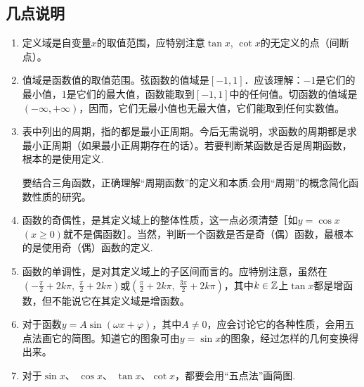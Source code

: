 \begin{figure}[htp]








    \caption{}
\end{figure}



\subsection*{几点说明}
\begin{enumerate}
    \item 定义域是自变量$x$的取值范围，应特别注意$\tan x$, $\cot x$的无定义的点（间断点）。
    \item 值域是函数值的取值范围。弦函数的值域是$[-1,1]$．应该理解：$-1$是它们的最小值，1是它们的最大值，函数能取到$[-1,1]$中的任何值。切函数的值域是$(-\infty,+\infty)$，因而，它们无最小值也无最大值，它们能取到任何实数值。
    \item 表中列出的周期，指的都是最小正周期。今后无需说明，求函数的周期都是求最小正周期（如果最小正周期存在的话）。若要判断某函数是否是周期函数，根本的是使用定义.
    
    要结合三角函数，正确理解“周期函数”的定义和本质.会用“周期”的概念简化函数性质的研究。
    \item 函数的奇偶性，是其定义域上的整体性质，这一点必须清楚［如$y=\cos x$\; $(x\ge 0)$就不是偶函数］。当然，判断一个函数是否是奇（偶）函数，最根本的是使用奇（偶）函数的定义.
    \item 函数的单调性，是对其定义域上的子区间而言的。应特别注意，虽然在$\left(-\frac{\pi}{2}+2k\pi,\; \frac{\pi}{2}+2k\pi\right)$或$\left(\frac{\pi}{2}+2k\pi,\; \frac{3\pi}{2}+2k\pi\right)$，其中$k\in\mathbb{Z}$上$\tan x$都是增函数，但不能说它在其定义域是增函数。
    \item  对于函数$y=A\sin(\omega x+\varphi)$，其中$A\ne 0$，应会讨论它的各种性质，会用五点法画它的简图。知道它的图象可由$y=\sin x$的图象，经过怎样的几何变换得出来。
    \item 对于$\sin x$、 $\cos x$、 $\tan x$、$\cot x$，都要会用“五点法”画简图.
\end{enumerate}




